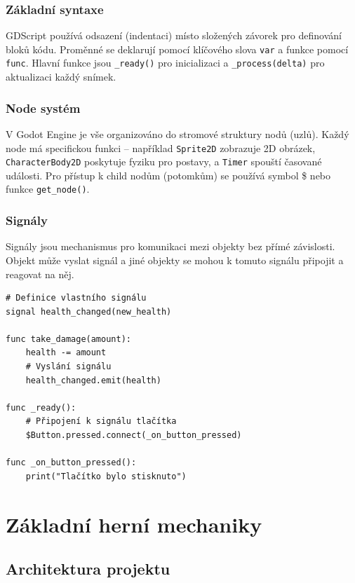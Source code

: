 \documentclass[12pt, a4paper,
oneside
]{report}
\begin{document}
	\subsection{Základní syntaxe}
	\nopagebreak
	
	GDScript používá odsazení (indentaci) místo složených závorek pro definování bloků kódu. Proměnné se deklarují pomocí klíčového slova \texttt{var} a funkce pomocí \texttt{func}. Hlavní funkce jsou \texttt{\_ready()} pro inicializaci a \texttt{\_process(delta)} pro aktualizaci každý snímek.

	\subsection{Node systém}
	
	V Godot Engine je vše organizováno do stromové struktury nodů (uzlů). Každý node má specifickou funkci -- například \texttt{Sprite2D} zobrazuje 2D obrázek, \texttt{CharacterBody2D} poskytuje fyziku pro postavy, a \texttt{Timer} spouští časované události. Pro přístup k child nodům (potomkům) se používá symbol \$ nebo funkce \texttt{get\_node()}.

	\subsection{Signály}
	\nopagebreak
	
	Signály jsou mechanismus pro komunikaci mezi objekty bez přímé závislosti. Objekt může vyslat signál a jiné objekty se mohou k tomuto signálu připojit a reagovat na něj.
	\nopagebreak
	
\begin{lstlisting}[style=GDScript, caption={Použití signálů}]
# Definice vlastního signálu
signal health_changed(new_health)

func take_damage(amount):
	health -= amount
	# Vyslání signálu
	health_changed.emit(health)
	
func _ready():
	# Připojení k signálu tlačítka
	$Button.pressed.connect(_on_button_pressed)
	
func _on_button_pressed():
	print("Tlačítko bylo stisknuto")
\end{lstlisting}

	\chapter{Základní herní mechaniky}
	\nopagebreak
	
	\section{Architektura projektu}
	\nopagebreak
	
\end{document}
